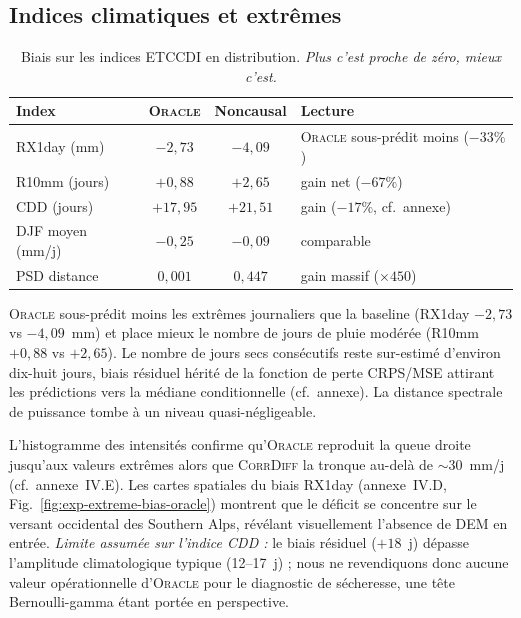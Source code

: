 \documentclass[14pt,a4paper,openany]{extreport}
\theoremstyle{definition}
\newcommand{\Oracle}{\textsc{Oracle}}
\newcommand{\CorrDiff}{\textsc{CorrDiff}}
\begin{document}
\subsection{Indices climatiques et extrêmes}
\label{ssec:exp-res-extremes}

\begin{table}[ht]
  \centering
  \small
  \caption{Biais sur les indices ETCCDI en distribution. \emph{Plus c'est proche de zéro, mieux c'est.}}
  \label{tab:exp-res-indices}
  \begin{tabularx}{\linewidth}{l c c X}
    \toprule
    \textbf{Index} & \Oracle{} & \textbf{Noncausal} & \textbf{Lecture} \\
    \midrule
    RX1day (mm) & $-2{,}73$ & $-4{,}09$ & \Oracle{} sous-prédit moins ($-33\%$) \\
    R10mm (jours) & $+0{,}88$ & $+2{,}65$ & gain net ($-67\%$) \\
    CDD (jours) & $+17{,}95$ & $+21{,}51$ & gain ($-17\%$, cf.~annexe) \\
    DJF moyen (mm/j) & $-0{,}25$ & $-0{,}09$ & comparable \\
    PSD distance & $0{,}001$ & $0{,}447$ & gain massif ($\times 450$) \\
    \bottomrule
  \end{tabularx}
\end{table}

\Oracle{} sous-prédit moins les extrêmes journaliers que la baseline (RX1day $-2{,}73$ vs $-4{,}09$~mm) et place mieux le nombre de jours de pluie modérée (R10mm $+0{,}88$ vs $+2{,}65$). Le nombre de jours secs consécutifs reste sur-estimé d'environ dix-huit jours, biais résiduel hérité de la fonction de perte CRPS/MSE attirant les prédictions vers la médiane conditionnelle (cf.~annexe). La distance spectrale de puissance tombe à un niveau quasi-négligeable.

L'histogramme des intensités confirme qu'\Oracle{} reproduit la queue droite jusqu'aux valeurs extrêmes alors que \CorrDiff{} la tronque au-delà de $\sim 30$~mm/j (cf.~annexe~IV.E). Les cartes spatiales du biais RX1day (annexe~IV.D, Fig.~\ref{fig:exp-extreme-bias-oracle}) montrent que le déficit se concentre sur le versant occidental des Southern Alps, révélant visuellement l'absence de DEM en entrée. \emph{Limite assumée sur l'indice CDD :} le biais résiduel ($+18$~j) dépasse l'amplitude climatologique typique (12--17~j) ; nous ne revendiquons donc aucune valeur opérationnelle d'\Oracle{} pour le diagnostic de sécheresse, une tête Bernoulli-gamma étant portée en perspective.
\end{document}
